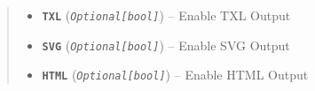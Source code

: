 \documentclass[letterpaper,10pt,english]{sphinxmanual}
\begin{document}
\begin{fulllineitems}
\begin{fulllineitems}
\begin{quote}
\begin{description}
\begin{itemize}
\item {} 
\textbf{\texttt{TXL}} (\emph{\texttt{Optional{[}bool{]}}}) -- Enable TXL Output

\item {} 
\textbf{\texttt{SVG}} (\emph{\texttt{Optional{[}bool{]}}}) -- Enable SVG Output

\item {} 
\textbf{\texttt{HTML}} (\emph{\texttt{Optional{[}bool{]}}}) -- Enable HTML Output

\end{itemize}

\end{description}\end{quote}

\end{fulllineitems}


\end{fulllineitems}
\end{document}
